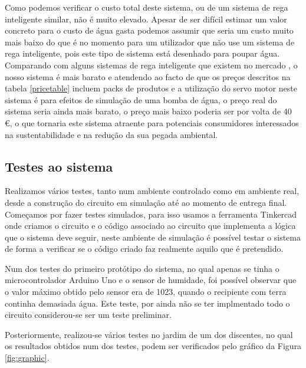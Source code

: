 \documentclass[conference]{IEEEtran}
\begin{document}
Como podemos verificar o custo total deste sistema, ou de um sistema de 
rega inteligente similar, não é muito elevado. Apesar de ser difícil estimar 
um valor concreto para o custo de água gasta podemos assumir que seria um custo 
muito mais baixo do que é no momento para um utilizador que não use um sistema de 
rega inteligente, pois este tipo de sistema está desenhado para poupar água. 
Comparando com alguns sistemas de rega inteligente que existem no 
mercado \cite{amazonOrbit} \cite{amazonNetro}, o nosso sistema é mais barato e 
atendendo ao facto de que os preços descritos na tabela \ref{pricetable} incluem packs de 
produtos e a utilização do servo motor neste sistema é para efeitos de simulação 
de uma bomba de água, o preço real do sistema seria ainda mais barato, o preço mais 
baixo poderia ser por volta de 40 €, o que tornaria este sistema atraente para 
potenciais consumidores interessados na sustentabilidade e na redução da sua pegada 
ambiental.

\subsection{Testes ao sistema}

Realizamos vários testes, tanto num ambiente controlado como em ambiente real, desde 
a construção do circuito em simulação até ao momento de entrega final. Começamos 
por fazer testes simulados, para isso usamos a ferramenta Tinkercad \cite{tinkercad} onde 
criamos o circuito e o código associado ao circuito que implementa a lógica 
que o sistema deve seguir, neste ambiente de simulação é possível testar 
o sistema de forma a verificar se o código criado faz realmente aquilo 
que é pretendido.

Num dos testes do primeiro protótipo do sistema, no qual apenas se tinha o microcontrolador
Arduino Uno e o sensor de humidade, foi possível observar que o valor máximo obtido pelo sensor 
era de 1023, quando o recipiente com terra continha demasiada água. Este teste, por ainda 
não se ter implmentado todo o circuito considerou-se ser um teste preliminar.

Posteriormente, realizou-se vários testes no jardim de um dos discentes, no qual os 
resultados obtidos num dos testes, podem ser verificados pelo gráfico da Figura \ref{fig:graphic}.
\end{document}
